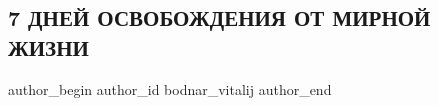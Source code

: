  
 
 
 
 
 
\subsection{7 ДНЕЙ ОСВОБОЖДЕНИЯ ОТ МИРНОЙ ЖИЗНИ}
\label{sec:19_03_2022.fb.bodnar_vitalij.1.7_dnej_osvobozhdenia}
 
\ifcmt
 author_begin
   author_id bodnar_vitalij
 author_end
\fi
